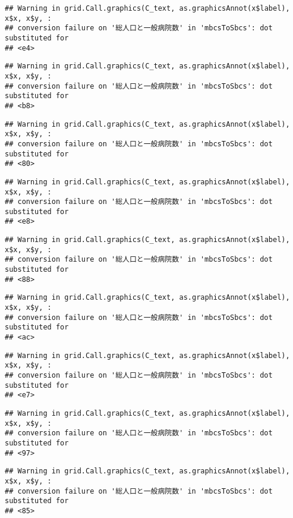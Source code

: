 \documentclass[
]{article}
\begin{document}
\begin{verbatim}
## Warning in grid.Call.graphics(C_text, as.graphicsAnnot(x$label), x$x, x$y, :
## conversion failure on '総人口と一般病院数' in 'mbcsToSbcs': dot substituted for
## <e4>
\end{verbatim}

\begin{verbatim}
## Warning in grid.Call.graphics(C_text, as.graphicsAnnot(x$label), x$x, x$y, :
## conversion failure on '総人口と一般病院数' in 'mbcsToSbcs': dot substituted for
## <b8>
\end{verbatim}

\begin{verbatim}
## Warning in grid.Call.graphics(C_text, as.graphicsAnnot(x$label), x$x, x$y, :
## conversion failure on '総人口と一般病院数' in 'mbcsToSbcs': dot substituted for
## <80>
\end{verbatim}

\begin{verbatim}
## Warning in grid.Call.graphics(C_text, as.graphicsAnnot(x$label), x$x, x$y, :
## conversion failure on '総人口と一般病院数' in 'mbcsToSbcs': dot substituted for
## <e8>
\end{verbatim}

\begin{verbatim}
## Warning in grid.Call.graphics(C_text, as.graphicsAnnot(x$label), x$x, x$y, :
## conversion failure on '総人口と一般病院数' in 'mbcsToSbcs': dot substituted for
## <88>
\end{verbatim}

\begin{verbatim}
## Warning in grid.Call.graphics(C_text, as.graphicsAnnot(x$label), x$x, x$y, :
## conversion failure on '総人口と一般病院数' in 'mbcsToSbcs': dot substituted for
## <ac>
\end{verbatim}

\begin{verbatim}
## Warning in grid.Call.graphics(C_text, as.graphicsAnnot(x$label), x$x, x$y, :
## conversion failure on '総人口と一般病院数' in 'mbcsToSbcs': dot substituted for
## <e7>
\end{verbatim}

\begin{verbatim}
## Warning in grid.Call.graphics(C_text, as.graphicsAnnot(x$label), x$x, x$y, :
## conversion failure on '総人口と一般病院数' in 'mbcsToSbcs': dot substituted for
## <97>
\end{verbatim}

\begin{verbatim}
## Warning in grid.Call.graphics(C_text, as.graphicsAnnot(x$label), x$x, x$y, :
## conversion failure on '総人口と一般病院数' in 'mbcsToSbcs': dot substituted for
## <85>
\end{verbatim}
\end{document}
